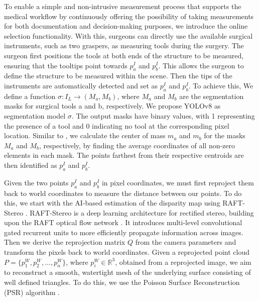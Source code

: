 \documentclass[letterpaper]{article} %
\begin{document}
To enable a simple and non-intrusive measurement process that supports the medical workflow by continuously offering the possibility of taking measurements for both documentation and decision-making purposes, we introduce the online selection functionality. With this, surgeons can directly use the available surgical instruments, such as two graspers, as measuring tools during the surgery. The surgeon first positions the tools at both ends of the structure to be measured, ensuring that the tooltips point towards $p_a^{I}$ and $p_b^{I}$. This allows the surgeon to define the structure to be measured within the scene. Then the tips of the instruments are automatically detected and set as $p_a^{I}$ and $p_b^{I}$. To achieve this, We define a function $\sigma: I_L \rightarrow (M_a, M_b)$, where $M_a$ and $M_b$ are the segmentation masks for surgical tools a and b, respectively. We propose YOLOv8 \cite{jocher_yolov8_2023} as segmentation model $\sigma$. The output masks have binary values, with 1 representing the presence of a tool and 0 indicating no tool at the corresponding pixel location. Similar to \citet{bodenstedt_image-based_2016}, we calculate the center of mass $m_a$ and $m_b$ for the masks $M_a$ and $M_b$, respectively, by finding the average coordinates of all non-zero elements in each mask. The points farthest from their respective centroids are then identified as $p_a^{I}$ and $p_b^{I}$.

Given the two points $p_a^{I}$ and $p_b^{I}$ in pixel coordinates, we must first reproject them back to world coordinates to measure the distance between our points. To do this, we start with the AI-based estimation of the disparity map using RAFT-Stereo \cite{lipson_raft-stereo_2021}. RAFT-Stereo is a deep learning architecture for rectified stereo, building upon the RAFT optical flow network \cite{Teed2020}. It introduces multi-level convolutional gated recurrent units to more efficiently propagate information across images. Then we derive the reprojection matrix $Q$ from the camera parameters and transform the pixels back to world coordinates. Given a reprojected point cloud $P = \{p_1^{W}, p_2^{W}, \ldots, p_n^{W}\}$, where $p_i^{W} \in \mathbb{R}^3$, obtained from a reprojected image, we aim to reconstruct a smooth, watertight mesh of the underlying surface consisting of well defined triangles. To do this, we use the Poisson Surface Reconstruction (PSR) algorithm \cite{kazhdan_poisson_2006}.
\end{document}
